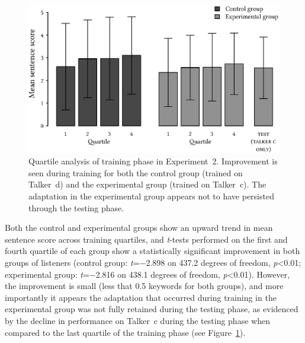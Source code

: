 \begin{figure}
	\begin{centering}
	\includegraphics{figures/results/QuartileBarplot.eps}
	\caption[Quartile analysis of training phase in Experiment~2]{Quartile analysis of training phase in Experiment~2.  Improvement is seen during training for both the control group (trained on Talker~\ac{d}) and the experimental group (trained on Talker~\ac{c}).  The adaptation in the experimental group appears not to have persisted through the testing phase.\label{fig:Quartile}}
	\end{centering}
\end{figure}

Both the control and experimental groups show an upward trend in mean sentence score across training quartiles, and \textit{t}-tests performed on the first and fourth quartile of each group show a statistically significant improvement in both groups of listeners (control group: \textit{t}=−2.898 on 437.2 degrees of freedom, \textit{p}<0.01; experimental group: \textit{t}=−2.816 on 438.1 degrees of freedom, \textit{p}<0.01).  However, the improvement is small (less that 0.5 keywords for both groups), and more importantly it appears the adaptation that occurred during training in the experimental group was not fully retained during the testing phase, as evidenced by the decline in performance on Talker~\ac{c} during the testing phase when compared to the last quartile of the training phase (see Figure~\ref{fig:Quartile}).\footnotemark{}


